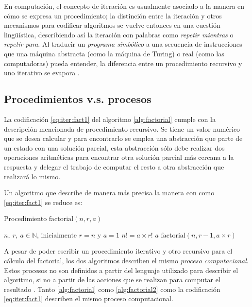 En computación, el concepto de iteración es usualmente asociado a la manera en cómo se expresa un procedimiento; la distinción entre la iteración y otros mecanismos para codificar algoritmos se vuelve entonces en una cuestión lingüística, describiendo así la iteración con palabras como \emph{repetir mientras} o \emph{repetir para}. Al traducir un \emph{programa simbólico} a una secuencia de instrucciones que una máquina abstracta (como la máquina de Turing) o real (como las computadoras) pueda entender, la diferencia entre un procedimiento recursivo y uno iterativo se evapora \cite[p.~73]{Aho:Dragon} \cite{Steele:LambdaGOTO}.

\subsection{Procedimientos v.s. procesos}
\label{sec:procedimientos-procesos}

La codificación \eqref{eq:iter:fact1} del algoritmo \ref{alg:factorial} cumple con la descripción mencionada de procedimiento recursivo. Se tiene un valor numérico que se desea calcular y para encontrarlo se emplea una abstracción que parte de un estado con una solución parcial, esta abstracción sólo debe realizar dos operaciones aritméticas para encontrar otra solución parcial más cercana a la respuesta y delegar el trabajo de computar el resto a otra abstracción que realizará lo mismo.

Un algoritmo que describe de manera más precisa la manera con como \eqref{eq:iter:fact1} se reduce es:

\begin{algorithm}
  \caption{Procedimiento \( \mathrm{factorial}(n,r,a) \)}
  \label{alg:factorial2}
  \begin{algorithmic}
    \REQUIRE \( n,\ r,\ a\in \mathbb{N} \), inicialmente \( r=n \) y \( a=1 \)
    \ENSURE \( n! = a\times r! \)
    \RETURN \( a \)
    \ELSE
    \RETURN \( \mathrm{factorial}(n,r-1,a\times r) \)
    \ENDIF
  \end{algorithmic}
\end{algorithm}

A pesar de poder escribir un procedimiento iterativo y otro recursivo para el cálculo del factorial, los dos algoritmos describen el mismo \emph{proceso computacional}. Estos procesos no son definidos a partir del lenguaje utilizado para describir el algoritmo, si no a partir de las acciones que se realizan para computar el resultado \cite{AbelsonSussman:Wizard}. Tanto \ref{alg:factorial} como \ref{alg:factorial2} como la codificación \eqref{eq:iter:fact1} describen el mismo proceso computacional.

